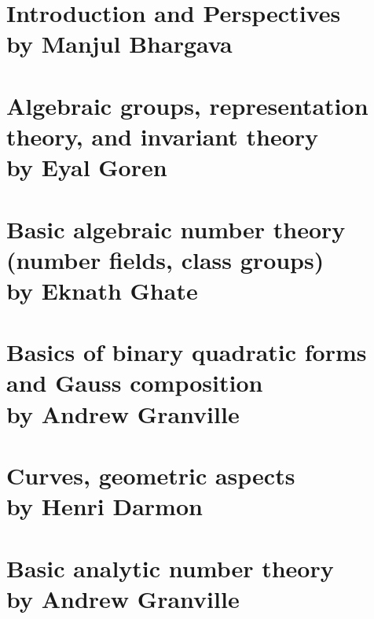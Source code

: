 \documentclass[12pt,amsfont]{amsart}
\begin{document}
\maketitle

\setcounter{tocdepth}{1}
\tableofcontents

\newpage
\section{Introduction and Perspectives\\by Manjul Bhargava}\label{1}

\begingroup
\renewcommand{\addcontentsline}[3]{}%
\endgroup


\newpage
\renewcommand{\thesubsection}{\arabic{section}.\arabic{subsection}}
\section{Algebraic groups, representation theory, and invariant theory
\\ by Eyal Goren}\label{2}


\newpage
\renewcommand{\thesubsection}{\arabic{section}.\arabic{subsection}}
\section{Basic algebraic number theory (number fields, class groups) \\by Eknath Ghate}\label{3}

\newpage
\renewcommand{\thesubsection}{\arabic{section}.\arabic{subsection}}
\section{Basics of binary quadratic forms and Gauss composition
\\ by Andrew Granville}\label{4}


\newpage
\section{Curves, geometric aspects
\\ by Henri Darmon}\label{5}

\begingroup
\renewcommand{\addcontentsline}[3]{}%
\endgroup


\newpage
\renewcommand{\thesubsection}{\arabic{section}.\arabic{subsection}}
\section{Basic analytic number theory\\ by Andrew Granville}\label{6}
\end{document}
